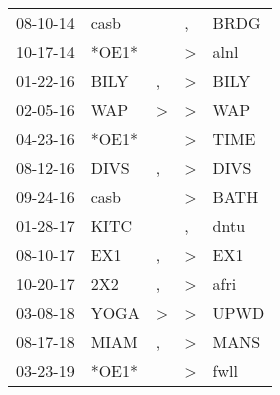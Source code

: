 \begin{supertabular}{p{0.07\textwidth}p{0.06\textwidth}p{0.02\textwidth}p{0.02\textwidth}p{0.06\textwidth}}
 08-10-14\textsuperscript{} &           casb\textsuperscript{} &                  &                , &           BRDG\textsuperscript{} \\
 10-17-14\textsuperscript{} &                            *OE1* &                  &     \textgreater &           alnl\textsuperscript{} \\
 01-22-16\textsuperscript{} &           BILY\textsuperscript{} &                , &     \textgreater &           BILY\textsuperscript{} \\
 02-05-16\textsuperscript{} &            WAP\textsuperscript{} &     \textgreater &     \textgreater &            WAP\textsuperscript{} \\
 04-23-16\textsuperscript{} &                            *OE1* &                  &     \textgreater &           TIME\textsuperscript{} \\
 08-12-16\textsuperscript{} &           DIVS\textsuperscript{} &                , &     \textgreater &           DIVS\textsuperscript{} \\
 09-24-16\textsuperscript{} &           casb\textsuperscript{} &                  &     \textgreater &           BATH\textsuperscript{} \\
 01-28-17\textsuperscript{} &           KITC\textsuperscript{} &                  &                , &           dntu\textsuperscript{} \\
 08-10-17\textsuperscript{} &            EX1\textsuperscript{} &                , &     \textgreater &            EX1\textsuperscript{} \\
 10-20-17\textsuperscript{} &            2X2\textsuperscript{} &                , &     \textgreater &           afri\textsuperscript{} \\
 03-08-18\textsuperscript{} &           YOGA\textsuperscript{} &     \textgreater &     \textgreater &           UPWD\textsuperscript{} \\
 08-17-18\textsuperscript{} &           MIAM\textsuperscript{} &                , &     \textgreater &           MANS\textsuperscript{} \\
 03-23-19\textsuperscript{} &                            *OE1* &                  &     \textgreater &           fwll\textsuperscript{} \\
\end{supertabular}

